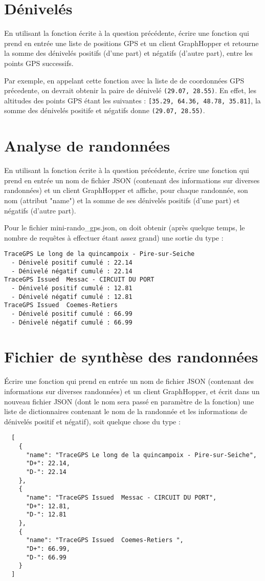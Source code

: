 \documentclass[11pt,a4paper]{article}
\begin{document}
\section{Dénivelés}

En utilisant la fonction écrite à la question précédente, écrire
une fonction qui prend en entrée une liste de positions GPS et un client GraphHopper et retourne la somme des dénivelés positifs (d’une part) et négatifs (d’autre part), entre les points GPS successifs. 

Par exemple, en appelant cette fonction avec la liste de de coordonnées GPS précedente, on devrait obtenir la paire de dénivelé \verb+(29.07, 28.55)+.
En effet, les altitudes des points GPS étant les suivantes :
\verb+[35.29, 64.36, 48.78, 35.81]+,  la somme des dénivelés positife et négatifs donne \verb+(29.07, 28.55)+.

\section{Analyse de randonnées}

En utilisant la fonction écrite à la question précédente, écrire une fonction qui prend en entrée un nom de fichier JSON (contenant des informations sur diverses randonnées) et un client GraphHopper et affiche, pour chaque randonnée, son nom (attribut "name") et la somme de ses dénivelés positifs (d’une part) et négatifs (d’autre part). 

Pour le fichier mini-rando\_gps.json, on doit obtenir (après quelque temps, le nombre de requêtes à effectuer étant assez grand) une sortie du type :
\begin{verbatim}
TraceGPS Le long de la quincampoix - Pire-sur-Seiche 
  - Dénivelé positif cumulé : 22.14
  - Dénivelé négatif cumulé : 22.14
TraceGPS Issued  Messac - CIRCUIT DU PORT 
  - Dénivelé positif cumulé : 12.81
  - Dénivelé négatif cumulé : 12.81
TraceGPS Issued  Coemes-Retiers  
  - Dénivelé positif cumulé : 66.99
  - Dénivelé négatif cumulé : 66.99
\end{verbatim}
\section{Fichier de synthèse des randonnées}

Écrire une fonction qui prend en entrée un nom de fichier JSON (contenant des informations sur diverses randonnées) et un client GraphHopper, et écrit dans un nouveau fichier JSON (dont le nom sera passé en paramètre de la fonction) une liste de dictionnaires contenant le nom de la randonnée et les informations de dénivelés positif et négatif), soit quelque chose du type :
\begin{verbatim}
  [
    {
      "name": "TraceGPS Le long de la quincampoix - Pire-sur-Seiche",
      "D+": 22.14,
      "D-": 22.14
    },
    {
      "name": "TraceGPS Issued  Messac - CIRCUIT DU PORT",
      "D+": 12.81,
      "D-": 12.81
    },
    {
      "name": "TraceGPS Issued  Coemes-Retiers ",
      "D+": 66.99,
      "D-": 66.99
    }
  ]
\end{verbatim}
\end{document}
